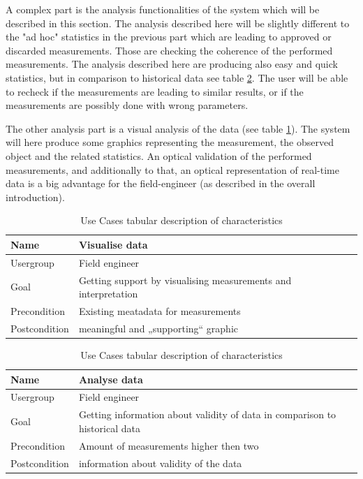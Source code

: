 A complex part is the analysis functionalities of the system which will be described in this section. The analysis described here will be slightly different to the "ad hoc" statistics in the previous part which are leading to approved or discarded measurements. Those are checking the coherence of the performed measurements. The analysis described here are producing also easy and quick statistics, but in comparison to historical data see table \ref{table:use case description of "Analyse data"}. The user will be able to recheck if the measurements are leading to similar results, or if the measurements are possibly done with wrong parameters. 

The other analysis part is a visual analysis of the data (see table \ref{table:use case description "Visualise data"}). The system will here produce some graphics representing the measurement, the observed object and the related statistics. An optical validation of the performed measurements, and additionally to that, an optical representation of real-time data is a big advantage for the field-engineer (as described in the overall introduction).

\begin{table}[H]
\centering
\begin{tabular}{l | p{11cm}}
Name & Visualise data\\ \hline 
Usergroup & Field engineer\\ \hline 
Goal & Getting support by visualising measurements and interpretation\\ \hline 
Precondition & Existing meatadata for measurements\\ \hline 
Postcondition & meaningful and „supporting“ graphic\\
\end{tabular}
\caption{Use Cases tabular description of characteristics} 
\label{table:use case description "Visualise data"}
\end{table}

\begin{table}[H]
\centering
\begin{tabular}{l | p{11cm}}
Name & Analyse data\\ \hline 
Usergroup & Field engineer\\ \hline 
Goal & Getting information about validity of data in comparison to historical data\\ \hline 
Precondition & Amount of measurements higher then two\\ \hline 
Postcondition & information about validity of the data\\ 
\end{tabular}
\caption{Use Cases tabular description of characteristics} 
\label{table:use case description of "Analyse data"}
\end{table}

